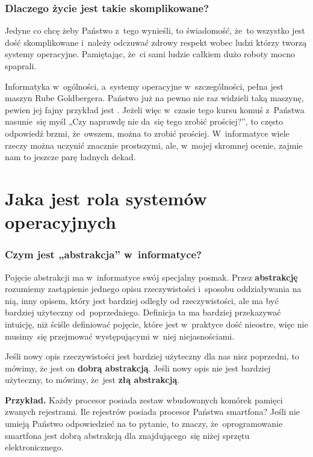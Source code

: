 \documentclass[10pt,t]{beamer}
\begin{document}
\begin{frame}
  \frametitle{Dlaczego życie jest takie skomplikowane?}


  Jedyne co chcę żeby Państwo z~tego wynieśli, to świadomość, że~to
  wszystko jest dość skomplikowane i~należy odczuwać zdrowy respekt wobec
  ludzi którzy tworzą systemy operacyjne. Pamiętając, że~ci sami ludzie
  całkiem dużo roboty mocno spaprali.

  Informatyka w~ogólności, a~systemy operacyjne w~szczególności, pełna jest
  maszyn Rube Goldbergera. Państwo już na pewno nie raz widzieli taką
  maszynę, pewien jej fajny przykład jest
  . Jeżeli
  więc w~czasie tego kursu komuś z~Państwa nasunie~się myśl „Czy naprawdę
  nie da~się tego zrobić prościej?”, to często odpowiedź brzmi, że~owszem,
  można to zrobić prościej. W~informatyce wiele rzeczy można uczynić
  znacznie prostszymi, ale, w~mojej skromnej ocenie, zajmie nam to jeszcze
  parę ładnych dekad.

\end{frame}










\section{Jaka jest rola systemów operacyjnych}


\begin{frame}
  \frametitle{Czym jest „abstrakcja” w~informatyce?}


  Pojęcie abstrakcji ma w~informatyce swój specjalny posmak.
  Przez \textbf{abstrakcję} rozumiemy zastąpienie jednego opisu
  rzeczywistości i~sposobu oddziaływania na nią, inny opisem, który jest
  bardziej odległy od rzeczywistości, ale ma być bardziej użyteczny
  od~poprzedniego. Definicja ta ma bardziej przekazywać intuicję, niż
  ściśle definiować pojęcie, które jest w~praktyce dość nieostre, więc
  nie musimy~się przejmować występującymi w~niej niejasnościami.

  Jeśli nowy opis rzeczywistości jest bardziej użyteczny dla nas nisz
  poprzedni, to mówimy, że jest on \textbf{dobrą abstrakcją}. Jeśli nowy
  opis nie jest bardziej użyteczny, to mówimy, że~jest \textbf{złą
    abstrakcją}.

  \textbf{Przykład.} Każdy procesor posiada zestaw wbudowanych komórek
  pamięci zwanych rejestrami. Ile rejestrów posiada procesor Państwa
  smartfona? Jeśli nie umieją Państwo odpowiedzieć na to pytanie, to
  znaczy, że~oprogramowanie smartfona jest dobrą abstrakcją dla
  znajdującego~się niżej sprzętu elektronicznego.

\end{frame}
\end{document}
